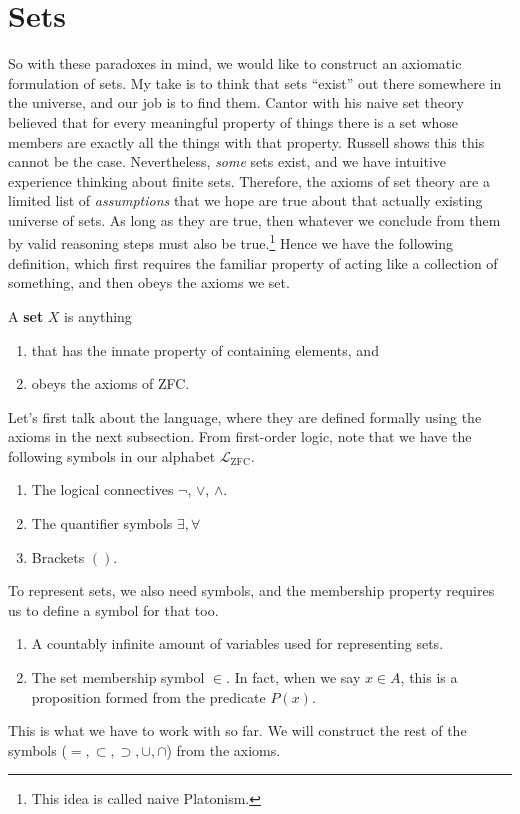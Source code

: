 \section{Sets} 

  So with these paradoxes in mind, we would like to construct an axiomatic formulation of sets. My take is to think that sets ``exist'' out there somewhere in the universe, and our job is to find them. Cantor with his naive set theory believed that for every meaningful property of things there is a set whose members are exactly all the things with that property. Russell shows this this cannot be the case. Nevertheless, \textit{some} sets exist, and we have intuitive experience thinking about finite sets. Therefore, the axioms of set theory are a limited list of \textit{assumptions} that we hope are true about that actually existing universe of sets. As long as they are true, then whatever we conclude from them by valid reasoning steps must also be true.\footnote{This idea is called naive Platonism.} Hence we have the following definition, which first requires the familiar property of acting like a collection of something, and then obeys the axioms we set. 
  
  \begin{definition}[Set]
    A \textbf{set} $X$ is anything 
    \begin{enumerate}
      \item that has the innate property of containing elements, and 
      \item obeys the axioms of ZFC. 
    \end{enumerate}
  \end{definition}  

  Let's first talk about the language, where they are defined formally using the axioms in the next subsection. From first-order logic, note that we have the following symbols in our alphabet $\mathcal{L}_{\mathrm{ZFC}}$. 
  \begin{enumerate}
    \item The logical connectives $\neg$, $\lor$, $\land$. 
    \item The quantifier symbols $\exists, \forall$ 
    \item Brackets $()$. 
  \end{enumerate}
  To represent sets, we also need symbols, and the membership property requires us to define a symbol for that too. 
  \begin{enumerate}
    \item A countably infinite amount of variables used for representing sets. 
    \item The set membership symbol $\in$. In fact, when we say $x \in A$, this is a proposition formed from the predicate $P(x)$. 
  \end{enumerate} 
  This is what we have to work with so far. We will construct the rest of the symbols ($=, \subset, \supset, \cup, \cap$) from the axioms. 

